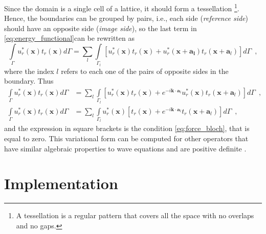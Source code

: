 Since the domain is a single cell of a lattice, it should form a tessellation \footnote{A tessellation is a regular pattern that covers all the space with no overlaps and no gaps.}. Hence, the boundaries can be grouped by pairs, i.e., each side (\emph{reference side}) should have an opposite side  (\emph{image side}), so the last term in \eqref{eq:energy_functional}can be rewritten as
\[ \int\limits_{\Gamma} u_r^{*}(\mathbf{x}) t_r(\mathbf{x}) d\Gamma = \sum\limits_{l} \int\limits_{\Gamma_l} [ u_r^{*}(\mathbf{x}) t_r(\mathbf{x}) + u_r^{*}(\mathbf{x+\mathbf{a}_l}) t_r(\mathbf{x}+\mathbf{a}_l) ]d\Gamma \enspace ,\]
where the index $l$ refers to each one of the pairs of opposite sides in the boundary. Thus
\begin{align*}
\int\limits_{\Gamma} u_r^{*}(\mathbf{x}) t_r(\mathbf{x}) d\Gamma &= \sum\limits_{l} \int\limits_{\Gamma_l} [ u_r^{*}(\mathbf{x}) t_r(\mathbf{x}) +e^{-i\mathbf{k}\cdot\mathbf{a}_l} u_r^{*}(\mathbf{x}) t_r(\mathbf{x}+\mathbf{a}_l) ]d\Gamma \enspace , \\
\int\limits_{\Gamma} u_r^{*}(\mathbf{x}) t_r(\mathbf{x}) d\Gamma &= \sum\limits_{l} \int\limits_{\Gamma_l} u_r^{*}(\mathbf{x})[ t_r(\mathbf{x}) +e^{-i\mathbf{k}\cdot\mathbf{a}_l} t_r(\mathbf{x}+\mathbf{a}_l) ]d\Gamma \enspace ,
\end{align*}
and the expression in square brackets is the condition \eqref{eq:force_bloch}, that is equal to zero. This variational form can be computed for other operators that have similar algebraic properties to wave equations and are positive definite \cite{algebraic_waves, book:reddy_functional_analysis, book:kreyzsig_functional}.

\section{Implementation}
